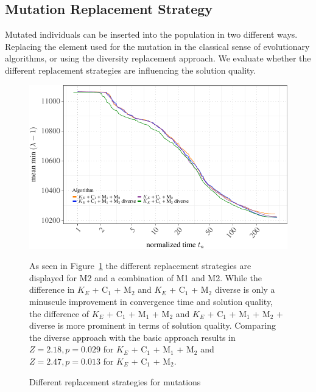 \documentclass[a4paper,12pt,titlepage, BCOR7mm,headsepline]{scrbook}
\numberwithin{equation}{section}
\begin{document}

\subsection{Mutation Replacement Strategy}


Mutated individuals can be inserted into the population in two different ways. Replacing the element used for the mutation in the classical sense of evolutionary algorithms, or using the diversity replacement approach. We evaluate whether the different replacement strategies are influencing the solution quality.
\begin{figure}[H]

\begin{center}
\includegraphics{rnw/tuning_subset_plots/diverse_plot-1}\caption{Different replacement strategies for mutations}\label{fig:rep_strat}

\end{center}
As seen in Figure~\ref{fig:rep_strat} the different replacement strategies are displayed for M2 and a combination of M1 and M2. While the difference in $K_E$ + C$_1$ + M$_2$ and $K_E$ + C$_1$ + M$_2$ diverse is only a minuscule improvement in convergence time and solution quality, the difference of $K_E$ + C$_1$ + M$_1$ + M$_2$ and $K_E$ + C$_1$ + M$_1$ + M$_2$ + diverse is more prominent in terms of solution quality. Comparing the diverse approach with the basic approach results in $Z = 2.18, p = 0.029$ for $K_E$ + C$_1$ + M$_1$ + M$_2$ and $Z = 2.47, p = 0.013$ for $K_E$ + C$_1$ + M$_2$.

\end{figure}
\end{document}
